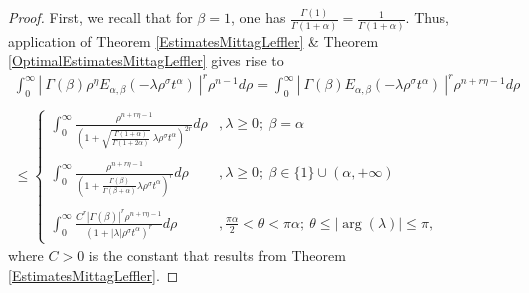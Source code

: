 \documentclass{amsart}
\theoremstyle{definition}
\theoremstyle{remark}
\numberwithin{equation}{section}
\begin{document}
{			\begin{proof}
				First, we recall that for $\beta=1$, one has
				$\displaystyle \frac{\Gamma(1)}{\Gamma(1+\alpha)}=\frac{1}{\Gamma(1+\alpha)}$.
				Thus, application of Theorem \ref{EstimatesMittagLeffler} \& Theorem \ref{OptimalEstimatesMittagLeffler} gives rise to  
				\begin{eqnarray}
					\label{IntegralIneq}
					\int_0^\infty\left|~\Gamma(\beta) \rho^{\eta} E_{\alpha,\beta}(-\lambda \rho^\sigma t^{\alpha})~\right|^r\rho^{n-1}d\rho= 	\int_0^\infty\left|~\Gamma(\beta) E_{\alpha,\beta}(-\lambda \rho^\sigma t^{\alpha})~\right|^r\rho^{n+r\eta-1}d\rho  \nonumber \\ \nonumber \\  \leq \begin{cases} \displaystyle \int_0^\infty \frac{\rho^{n+r\eta-1}}{\left(1+\sqrt{\frac{\Gamma(1+\alpha)}{\Gamma(1+2\alpha)}}~\lambda \rho^\sigma t^{\alpha}\right)^{2r}} d\rho &, \lambda\geq 0;~\beta=\alpha
						\\ \ \\
						\displaystyle \int_0^\infty \frac{\rho^{n+r\eta-1}}{\left(1+\frac{\Gamma(\beta)}{\Gamma(\beta+\alpha)}\lambda \rho^\sigma t^{\alpha}\right)^r} d\rho&, \lambda\geq 0;~\beta\in \{1\}\cup (\alpha,+\infty) \\ \ \\
						\displaystyle \int_0^\infty\frac{C^r|\Gamma(\beta)|^r\rho^{n+r\eta-1}}{(1+|\lambda| \rho^\sigma t^{\alpha})^r} d\rho&, \frac{\pi\alpha}{2}<\theta<\pi \alpha;~\theta\leq |\arg(\lambda)|\leq \pi,
					\end{cases}
				\end{eqnarray}
				where $C>0$ is the constant that results from Theorem \ref{EstimatesMittagLeffler}.
				

\end{proof}}
\end{document}
